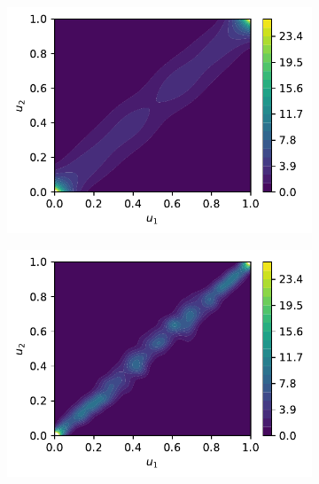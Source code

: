 \documentclass[../Thesis.tex]{subfiles}
\begin{document}
\begin{figure}[ht]
    \centering
    \begin{subfigure}[t]{0.49\textwidth}
        \centering
        \includegraphics[width=\linewidth]{figures/MI estimation/regularized Jones - rho 0.99 - comparison of methods.pdf}
        \caption{}
    \end{subfigure}
    \hfill
    \begin{subfigure}[t]{0.49\textwidth}
        \centering
        \includegraphics[width=\linewidth]{figures/MI estimation/regularized Jones - rho 0.99 - comparison of methods - 0.3 hscott.pdf}
        \caption{}
    \end{subfigure}
    \\[\baselineskip]

\end{figure}
\end{document}
